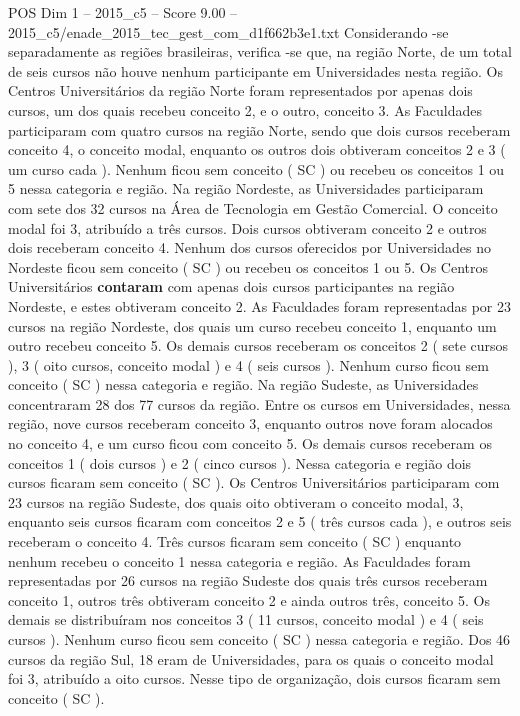 \begin{textsample}{POS Dim 1 – 2015\_c5 – Score 9.00 – 2015\_c5/enade\_2015\_tec\_gest\_com\_d1f662b3e1.txt}
Considerando -se separadamente as regiões brasileiras, verifica -se que, na região Norte, de um total de seis cursos não houve nenhum participante em Universidades nesta região.
Os Centros Universitários da região Norte foram representados por apenas dois cursos, um dos quais recebeu conceito 2, e o outro, conceito 3.
As Faculdades participaram com quatro cursos na região Norte, sendo que dois cursos receberam conceito 4, o conceito modal, enquanto os outros dois obtiveram conceitos 2 e 3 ( um curso cada ).
Nenhum ficou sem conceito ( SC ) ou recebeu os conceitos 1 ou 5 nessa categoria e região.
Na região Nordeste, as Universidades participaram com sete dos 32 cursos na Área de Tecnologia em Gestão Comercial.
O conceito modal foi 3, atribuído a três cursos.
Dois cursos obtiveram conceito 2 e outros dois receberam conceito 4.
Nenhum dos cursos oferecidos por Universidades no Nordeste ficou sem conceito ( SC ) ou recebeu os conceitos 1 ou 5.
Os Centros Universitários \textbf{contaram} com apenas dois cursos participantes na região Nordeste, e estes obtiveram conceito 2.
As Faculdades foram representadas por 23 cursos na região Nordeste, dos quais um curso recebeu conceito 1, enquanto um outro recebeu conceito 5.
Os demais cursos receberam os conceitos 2 ( sete cursos ), 3 ( oito cursos, conceito modal ) e 4 ( seis cursos ).
Nenhum curso ficou sem conceito ( SC ) nessa categoria e região.
Na região Sudeste, as Universidades concentraram 28 dos 77 cursos da região.
Entre os cursos em Universidades, nessa região, nove cursos receberam conceito 3, enquanto outros nove foram alocados no conceito 4, e um curso ficou com conceito 5.
Os demais cursos receberam os conceitos 1 ( dois cursos ) e 2 ( cinco cursos ).
Nessa categoria e região dois cursos ficaram sem conceito ( SC ).
Os Centros Universitários participaram com 23 cursos na região Sudeste, dos quais oito obtiveram o conceito modal, 3, enquanto seis cursos ficaram com conceitos 2 e 5 ( três cursos cada ), e outros seis receberam o conceito 4.
Três cursos ficaram sem conceito ( SC ) enquanto nenhum recebeu o conceito 1 nessa categoria e região.
As Faculdades foram representadas por 26 cursos na região Sudeste dos quais três cursos receberam conceito 1, outros três obtiveram conceito 2 e ainda outros três, conceito 5.
Os demais se distribuíram nos conceitos 3 ( 11 cursos, conceito modal ) e 4 ( seis cursos ).
Nenhum curso ficou sem conceito ( SC ) nessa categoria e região.
Dos 46 cursos da região Sul, 18 eram de Universidades, para os quais o conceito modal foi 3, atribuído a oito cursos.
Nesse tipo de organização, dois cursos ficaram sem conceito ( SC ).

\end{textsample}
